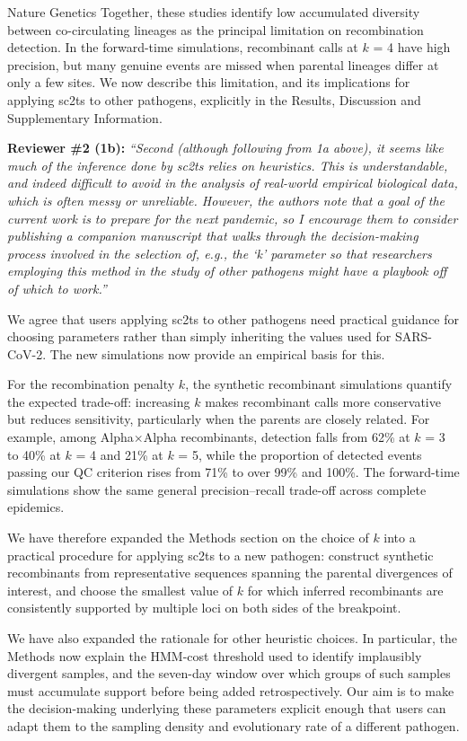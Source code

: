\documentclass{letter}
\begin{document}
\begin{letter}{Nature Genetics}
Together, these studies identify low accumulated diversity between
co-circulating lineages as the principal limitation on recombination detection.
In the forward-time simulations, recombinant calls at $k$ = 4 have high
precision, but many genuine events are missed when parental lineages differ at
only a few sites. We now describe this limitation, and its implications for
applying sc2ts to other pathogens, explicitly in the Results, Discussion and
Supplementary Information.

\noindent \textbf{Reviewer \#2 (1b):} \textit{``Second (although following from 1a
above), it seems like much of the inference done by sc2ts relies on
heuristics. This is understandable, and indeed difficult to avoid in the
analysis of real-world empirical biological data, which is often messy or
unreliable. However, the authors note that a goal of the current work is to
prepare for the next pandemic, so I encourage them to consider publishing a
companion manuscript that walks through the decision-making process involved
in the selection of, e.g., the `k' parameter so that researchers employing
this method in the study of other pathogens might have a playbook off of which
to work.''}

We agree that users applying sc2ts to other pathogens need practical guidance
for choosing parameters rather than simply inheriting the values used for
SARS-CoV-2. The new simulations now provide an empirical basis for this.

For the recombination penalty $k$, the synthetic recombinant simulations quantify
the expected trade-off: increasing $k$ makes recombinant calls more conservative
but reduces sensitivity, particularly when the parents are closely related. For
example, among Alpha$\times$Alpha recombinants, detection falls from 62\% at
$k$ = 3 to 40\% at $k$ = 4 and 21\% at $k$ = 5, while the proportion of detected events
passing our QC criterion rises from 71\% to over 99\% and 100\%. The forward-time
simulations show the same general precision--recall trade-off across complete
epidemics.

We have therefore expanded the Methods section on the choice of $k$ into a
practical procedure for applying sc2ts to a new pathogen: construct synthetic
recombinants from representative sequences spanning the parental divergences of
interest, and choose the smallest value of $k$ for which inferred recombinants
are consistently supported by multiple loci on both sides of the breakpoint.

We have also expanded the rationale for other heuristic choices. In particular,
the Methods now explain the HMM-cost threshold used to identify implausibly
divergent samples, and the seven-day window over which groups of such samples
must accumulate support before being added retrospectively. Our aim is to make the decision-making
underlying these parameters explicit enough that users can adapt them to the
sampling density and evolutionary rate of a different pathogen.


\end{letter}
\end{document}

